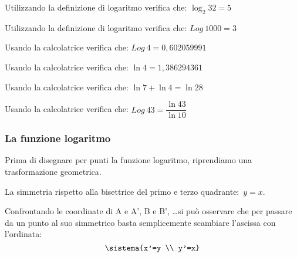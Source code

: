 \begin{esempio}
 Utilizzando la definizione di logaritmo verifica che: \(\log_2 32 = 5\)
\end{esempio}

\begin{esempio}
 Utilizzando la definizione di logaritmo verifica che: \(Log~1000 = 3\)
\end{esempio}

\begin{esempio}
 Usando la calcolatrice verifica che: \(Log~4 = 0,602059991\)
\end{esempio}

\begin{esempio}
 Usando la calcolatrice verifica che: \(\ln 4 = 1,386294361\)
\end{esempio}

\begin{esempio}
 Usando la calcolatrice verifica che: \(\ln 7 + \ln 4 = \ln 28\)
\end{esempio}

\begin{esempio}
 Usando la calcolatrice verifica che: \(Log~43 = \dfrac{\ln 43}{\ln 10}\)
\end{esempio}

\subsubsection{La funzione logaritmo}
\label{subsubsec:esplog_funzione_logaritmo}
Prima di disegnare per punti la funzione logaritmo, riprendiamo una 
trasformazione geometrica.

\noindent
\begin{minipage}[]{.48\textwidth}
La simmetria rispetto alla bisettrice del primo e terzo quadrante:~\(y=x\).

Confrontando le coordinate di A e A', B e B', \dots si può osservare che per 
passare da un punto al suo simmetrico basta semplicemente scambiare l'ascissa 
con l'ordinata:
\[\sistema{x'=y \\ y'=x}\]
\end{minipage} \hspace{.04\textwidth}
\begin{minipage}[]{.48\textwidth}
\begin{center}
\begin{inaccessibleblock}
  \simmetriayx
\end{inaccessibleblock}
\end{center}
\end{minipage} 


